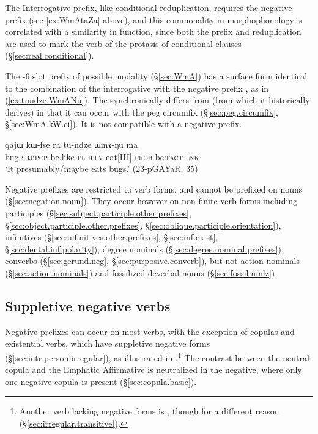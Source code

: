 The Interrogative  prefix, like conditional reduplication, requires the  negative prefix (see \ref{ex:WmAtaZa} above), and this commonality in morphophonology is correlated with a similarity in function, since both the prefix  and reduplication are used to mark the verb of the protasis of conditional clauses (§\ref{sec:real.conditional}).


The -6 slot  prefix of possible modality (§\ref{sec:WmA}) has a surface form identical to the combination of the interrogative  with the negative prefix , as in (\ref{ex:tundze.WmANu}). The  synchronically differs from  (from which it historically derives) in that it can occur with the peg circumfix (§\ref{sec:peg.circumfix}, §\ref{sec:WmA.kW.ci}). It is not compatible with a negative prefix.

\begin{exe}
	\ex \label{ex:tundze.WmANu}
	\gll  qajɯ kɯ-fse ra tu-ndze ɯmɤ-ŋu ma \\
	bug \textsc{sbj}:\textsc{pcp}-be.like \textsc{pl} \textsc{ipfv}-eat[III] \textsc{prob}-be:\textsc{fact} \textsc{lnk} \\
	\glt `It presumably/maybe eats bugs.' (23-pGAYaR, 35)
\end{exe}

Negative prefixes are restricted to verb forms, and cannot be prefixed on nouns (§\ref{sec:negation.noun}).  They occur however on non-finite verb forms including participles (§\ref{sec:subject.participle.other.prefixes}, §\ref{sec:object.participle.other.prefixes}, §\ref{sec:oblique.participle.orientation}), infinitives (§\ref{sec:infinitives.other.prefixes}, §\ref{sec:inf.exist}, §\ref{sec:dental.inf.polarity}), degree nominals (§\ref{sec:degree.nominal.prefixes}), converbs (§\ref{sec:gerund.neg}, §\ref{sec:purposive.converb}), but not action nominals (§\ref{sec:action.nominals}) and  fossilized deverbal nouns (§\ref{sec:fossil.nmlz}).

\subsection{Suppletive negative verbs} \label{sec:suppletive.negative}
Negative prefixes can occur on most verbs, with the exception of copulas and existential verbs, which have suppletive negative forms (§\ref{sec:intr.person.irregular}), as illustrated in .\footnote{Another verb lacking negative forms is  , though for a different reason (§\ref{sec:irregular.transitive}). } The contrast between the neutral copula  and the Emphatic Affirmative  is neutralized in the negative, where only one negative copula  is present (§\ref{sec:copula.basic}).

